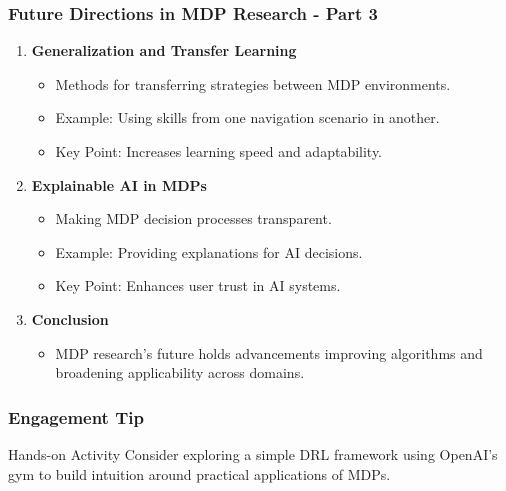 \documentclass[aspectratio=169]{beamer}
\begin{document}
\begin{frame}[fragile]
    \frametitle{Future Directions in MDP Research - Part 3}
    \begin{enumerate}
        \item \textbf{Generalization and Transfer Learning}
            \begin{itemize}
                \item Methods for transferring strategies between MDP environments.
                \item Example: Using skills from one navigation scenario in another.
                \item Key Point: Increases learning speed and adaptability.
            \end{itemize}

        \item \textbf{Explainable AI in MDPs}
            \begin{itemize}
                \item Making MDP decision processes transparent.
                \item Example: Providing explanations for AI decisions.
                \item Key Point: Enhances user trust in AI systems.
            \end{itemize}
        
        \item \textbf{Conclusion}
            \begin{itemize}
                \item MDP research’s future holds advancements improving algorithms and broadening applicability across domains.
            \end{itemize}
    \end{enumerate}
\end{frame}

\begin{frame}[fragile]
    \frametitle{Engagement Tip}
    \begin{block}{Hands-on Activity}
        Consider exploring a simple DRL framework using OpenAI's gym to build intuition around practical applications of MDPs.
    \end{block}
\end{frame}
\end{document}

